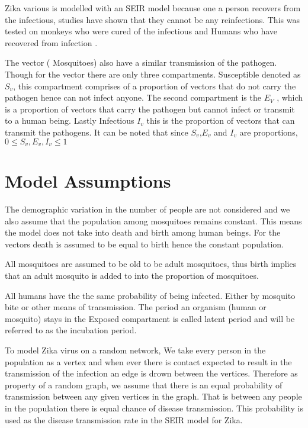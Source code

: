 Zika various is modelled with an SEIR model because one a person recovers from the infectious, studies have shown that they cannot be any reinfections. This was tested on monkeys who were cured of the infectious and Humans who have recovered from infection \citep{posen2016epidemiology}.

The vector ( Mosquitoes) also have a similar transmission of the pathogen. Though for the vector there are only three compartments. Susceptible denoted as $S_v$, this compartment comprises of a proportion of vectors that do not carry the pathogen hence can not infect anyone. The second compartment is the $E_V$ , which is a proportion of vectors that carry the pathogen but cannot infect or transmit to a human being. Lastly Infectious $I_v$ this is the proportion of vectors that can transmit the pathogens. It can be noted that since $S_v$,$E_v$ and $I_v$ are proportions, $ 0 \le S_v,E_v , I_v \le 1$ 

\section{ Model Assumptions}



The demographic variation in the number of people are not considered  and we also assume that the population among mosquitoes remains constant. This means the model does not take into death and birth among human beings. For the vectors death is assumed to be equal to birth hence the constant population. 

All mosquitoes are assumed to be old to be adult mosquitoes, thus birth implies that an adult mosquito is added to into the proportion of mosquitoes.

All humans have the the same probability of being infected. Either by mosquito bite or other means of  transmission. The period an organism (human or mosquito) stays in the Exposed compartment is called latent period and will be referred to as the incubation period.

To model Zika virus on a random network, We take every person in the population as a vertex and when ever there is contact expected to result in the transmission of the  infection an edge is drown between the vertices. Therefore as property of a random graph, we assume that there is an equal probability of transmission between any given vertices in the graph. That is between any people in the population there is equal chance of disease transmission. This probability is used as the disease transmission rate in the SEIR model for Zika.

